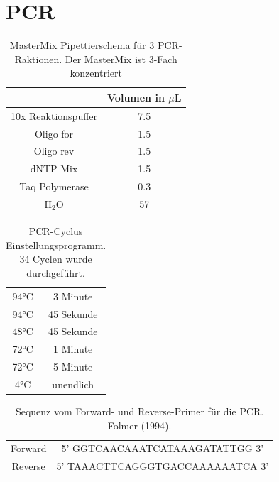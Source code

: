 \documentclass[oneside,10pt,a4paper]{report}
\begin{document}
		\section{PCR}
		\begin{table}[H]
			\centering
			\caption{MasterMix Pipettierschema für 3 PCR-Raktionen. Der MasterMix ist 3-Fach konzentriert}
			\label{tab: Mastermix-Pipettierschema}
			\begin{tabular}{cc}
				\toprule
				& Volumen in $\mu$L\\
				\midrule
				10x Reaktionspuffer & 7.5 \\
				Oligo for & 1.5\\
				Oligo rev & 1.5\\
				dNTP Mix & 1.5\\
				Taq Polymerase & 0.3\\
				H$_2$O & 57\\
				\bottomrule
			\end{tabular}
		\end{table}
		
		
		\begin{table}[H]
			\centering
			\caption{PCR-Cyclus Einstellungsprogramm. 34 Cyclen wurde durchgeführt.}
			\label{tab: PCR-Cyclen}
			\begin{tabular}{cc}
				\toprule
				94°C & 3 Minute\\
				94°C & 45 Sekunde\\
				48°C & 45 Sekunde\\
				72°C & 1 Minute\\
				72°C & 5 Minute\\
				4°C & unendlich\\
				\bottomrule
			\end{tabular}
		\end{table}
		
		\begin{table}[H]
			\centering
			\caption{Sequenz vom Forward- und Reverse-Primer für die PCR. Folmer (1994).}
			\label{tab: Primer}
			\begin{tabular}{cc}
				Forward & 5’ GGTCAACAAATCATAAAGATATTGG 3'\\
				Reverse & 5’ TAAACTTCAGGGTGACCAAAAAATCA 3’\\				
			\end{tabular}
		\end{table}
		
\end{document}
